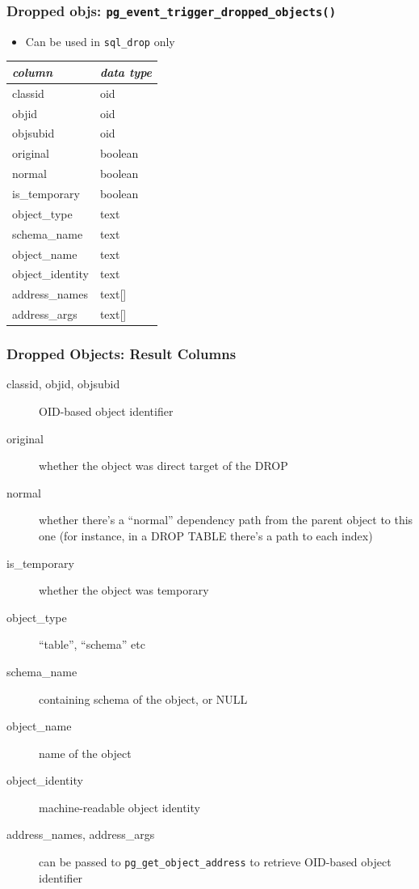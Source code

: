 \frame
{ \frametitle{Dropped objs: \texttt{pg\_event\_trigger\_dropped\_objects()}}

\begin{itemize}
\item Can be used in \texttt{sql\_drop} only
\end{itemize}

\begin{tabular}{l | l}
\textit{column} & \textit{data type} \\ \hline
classid & oid \\
objid & oid \\
objsubid & oid \\
original & boolean \\
normal & boolean \\
is\_temporary & boolean \\
object\_type & text \\
schema\_name & text \\
object\_name & text \\
object\_identity & text \\
address\_names & text[] \\
address\_args & text[] \\
\end{tabular}
}

\frame
{ \frametitle{Dropped Objects: Result Columns}

\begin{description}
\item[classid, objid, objsubid] OID-based object identifier
\item[original] whether the object was direct target of the DROP
\item[normal] whether there's a ``normal'' dependency path from the parent object to this one
    (for instance, in a DROP TABLE there's a path to each index)
\item[is\_temporary] whether the object was temporary
\item[object\_type] ``table'', ``schema'' etc
\item[schema\_name] containing schema of the object, or NULL
\item[object\_name] name of the object
\item[object\_identity] machine-readable object identity
\item[address\_names, address\_args] can be passed to \texttt{pg\_get\_object\_address} to
	retrieve OID-based object identifier
\end{description}

}

